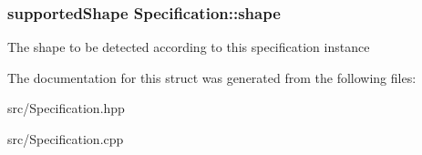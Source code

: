 \subsubsection[{\texorpdfstring{shape}{shape}}]{\setlength{\rightskip}{0pt plus 5cm}supported\+Shape Specification\+::shape}\hypertarget{structSpecification_a07d43e0225d3d091376ff907493d9f5e}{}\label{structSpecification_a07d43e0225d3d091376ff907493d9f5e}
The shape to be detected according to this specification instance 

The documentation for this struct was generated from the following files\+:\begin{DoxyCompactItemize}
\item 
src/Specification.\+hpp\item 
src/Specification.\+cpp\end{DoxyCompactItemize}
